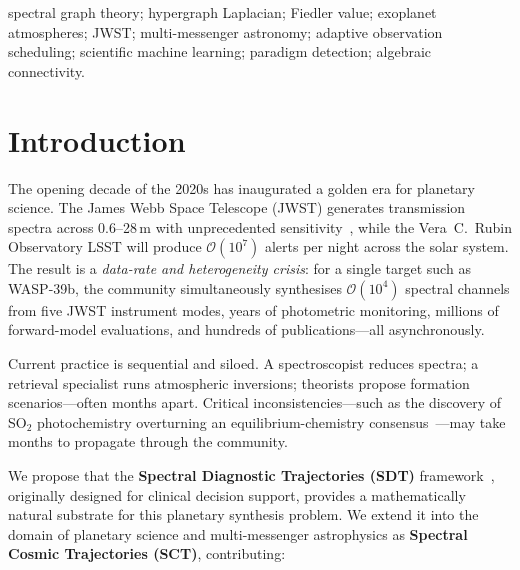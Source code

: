 \documentclass[conference]{IEEEtran}
\begin{document}
\begin{IEEEkeywords}
spectral graph theory; hypergraph Laplacian; Fiedler value; exoplanet
atmospheres; JWST; multi-messenger astronomy; adaptive observation
scheduling; scientific machine learning; paradigm detection; algebraic
connectivity.
\end{IEEEkeywords}

\section{Introduction}\label{sec:intro}

The opening decade of the 2020s has inaugurated a golden era for
planetary science. The James Webb Space Telescope (JWST) generates
transmission spectra across 0.6--28\,\textmu m with unprecedented
sensitivity~\cite{jwst_ers_2023}, while the Vera~C.\ Rubin Observatory
LSST will produce $\mathcal{O}(10^7)$ alerts per night across the solar
system. The result is a \emph{data-rate and heterogeneity crisis}: for a
single target such as WASP-39b, the community simultaneously synthesises
$\mathcal{O}(10^4)$ spectral channels from five JWST instrument modes,
years of photometric monitoring, millions of forward-model evaluations,
and hundreds of publications---all asynchronously.

Current practice is sequential and siloed. A spectroscopist reduces
spectra; a retrieval specialist runs atmospheric inversions; theorists
propose formation scenarios---often months apart. Critical
inconsistencies---such as the discovery of SO$_2$ photochemistry
overturning an equilibrium-chemistry consensus~\cite{tsai2023so2}---may
take months to propagate through the community.

We propose that the \textbf{Spectral Diagnostic Trajectories (SDT)}
framework~\cite{sdt2026}, originally designed for clinical decision
support, provides a mathematically natural substrate for this planetary
synthesis problem. We extend it into the domain of planetary science and
multi-messenger astrophysics as \textbf{Spectral Cosmic Trajectories
(SCT)}, contributing:
\end{document}
